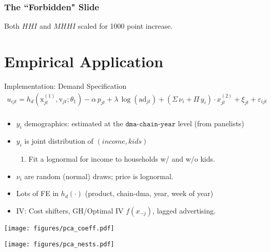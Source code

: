 \begin{frame}[plain]
\frametitle{The ``Forbidden" Slide}
\begin{center}
\scalebox{.6}{}
\end{center}
\scriptsize Both $HHI$ and $MHHI$ scaled for 1000 point increase.
\end{frame}

\section{Empirical Application}

\begin{frame}{Implementation: Demand Specification}
\begin{gather*}
u_{ijt} =  h_d(\textrm{x}_{jt}^{(1)}, \textrm{v}_{jt}; \theta_1) - \alpha\, p_{jt} + \lambda \, \log(\text{ad}_{jt})  + \left(\Sigma \, \nu_i + \Pi\, y_i \right) \cdot x_{jt}^{(2)}+ \xi_{jt} + \varepsilon_{ijt}\\
\end{gather*}
\vspace{-0.75cm}
\begin{itemize}
\item $y_i$ demographics: estimated at the $\texttt{dma-chain-year}$ level (from panelists)
\item $y_i$ is joint distribution of $(income, kids)$
\begin{enumerate}
\item Fit a lognormal for income to households w/ and w/o kids.
\end{enumerate}
\item $\nu_i$ are random (normal) draws; price is lognormal.
\item Lots of FE in $h_d(\cdot)$ (product, chain-dma, year, week of year)
\item IV: Cost shifters, GH/Optimal IV $f(x_{-j})$, lagged advertising.
\end{itemize}
\end{frame}

\begin{frame}[plain]
\begin{center}
\texttt{[image: figures/pca\_coeff.pdf]}
\end{center}
\end{frame}


\begin{frame}[plain]
\begin{center}
\texttt{[image: figures/pca\_nests.pdf]}
\end{center}
\end{frame}



